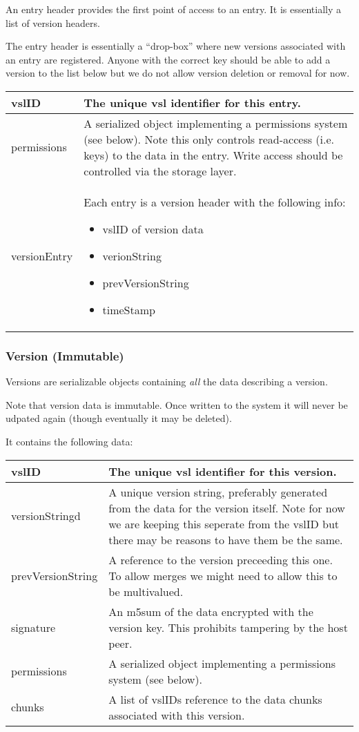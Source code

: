 \documentclass[10pt]{article}
\begin{document}
An entry header provides the first point of access to an entry.  It is
essentially a list of version headers.

The entry header is essentially a ``drop-box'' where new versions associated
with an entry are registered.  Anyone with the correct key should be able to
add a version to the list below but we do not allow version deletion or removal
for now.


\begin{tabular}{|l|p{12cm}|}
\hline
vslID & The unique vsl identifier for this entry.\\
\hline
permissions & A serialized object implementing a permissions system (see below).
Note this only controls read-access (i.e. keys) to the data in the entry.  Write
access should be controlled via the storage layer. \\
\hline
versionEntry &  Each entry is a version header with the following info:
\begin{itemize}
	\item vslID of version data
	\item verionString 
	\item prevVersionString
	\item timeStamp
\end{itemize}\\
\hline
\end{tabular}



\subsubsection{Version (Immutable)}

Versions are serializable objects containing {\em all} the data describing a
version. 

Note that version data is immutable.  Once written to the system it will never
be udpated again (though eventually it may be deleted).

It contains the following data:


\begin{tabular}{|l|p{12cm}|}
\hline
vslID & The unique vsl identifier for this version.\\
\hline
versionStringd &  A unique version string, preferably generated from the data
for the version itself. Note for now we are keeping this seperate from the vslID
but there may be reasons to have them be the same.\\
\hline
prevVersionString & A reference to the version preceeding this one.  To allow merges we might need to allow this to be multivalued.\\
\hline
signature & An m5sum of the data encrypted with the version key.  This prohibits tampering by the host peer.\\
\hline
permissions & A serialized object implementing a permissions system (see below).\\
\hline
chunks & A list of vslIDs reference to the data chunks associated with this version.\\
\hline
\end{tabular}
\end{document}
